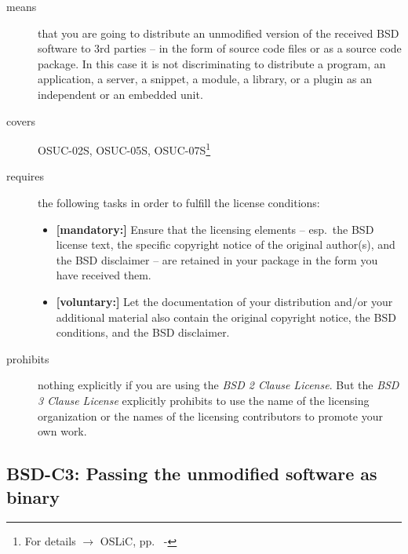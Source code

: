 \begin{description}
\item[means] that you are going to distribute an unmodified version of the
received BSD software to 3rd parties -- in the form of source code files or as a
source code package. In this case it is not discriminating to distribute a
program, an application, a server, a snippet, a module, a library, or a plugin
as an independent or an embedded unit.

\item[covers] OSUC-02S, OSUC-05S, OSUC-07S\footnote{For details $\rightarrow$
OSLiC, pp.\ \pageref{OSUC-02S-DEF} - \pageref{OSUC-07S-DEF}}

\item[requires] the following tasks in order to fulfill the license conditions:
\begin{itemize}
  \item \textbf{[mandatory:]} Ensure that the licensing elements -- esp.\ the
  BSD license text, the specific copyright notice of the original author(s), and
  the BSD disclaimer -- are retained in your package in the form you have
  received them.
  \item \textbf{[voluntary:]} Let the documentation of your distribution
  and/or your additional material also contain the original copyright notice, the
  BSD conditions, and the BSD disclaimer.
\end{itemize}

\item[prohibits] nothing explicitly if you are using the \emph{BSD 2 Clause
License}. But the \emph{BSD 3 Clause License} explicitly prohibits to use the
name of the licensing organization or the names of the licensing contributors to
promote your own work.

\end{description}

\subsection{BSD-C3: Passing the unmodified software as binary}
\label{OSUC-02B-BSD} \label{OSUC-05B-BSD} \label{OSUC-07B-BSD} 

